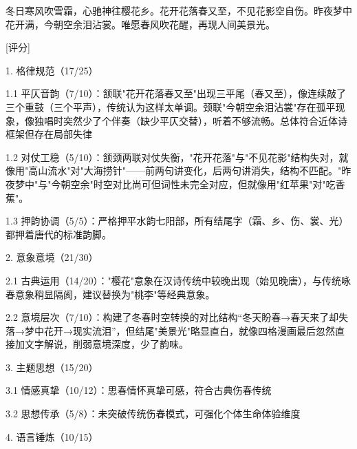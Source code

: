 \begin{tcolorbox}[
    breakable,            %
    colback=white, %
    colframe=black, 
    boxrule=1pt,        %
    arc=0mm             %
    ]
    \kaishu 
    冬日寒风吹雪霜，心驰神往樱花乡。花开花落春又至，不见花影空自伤。昨夜梦中花开满，今朝空余泪沾裳。唯愿春风吹花醒，再现人间美景光。

    \vspace{0.1em}
    \noindent\dotfill

    [评分]\par
    1. 格律规范（17/25）\par
        \hspace{2em}1.1 平仄音韵（7/10）：颔联"花开花落春又至"出现三平尾（春又至），像连续敲了三个重鼓（三个平声），传统认为这样太单调。颈联"今朝空余泪沾裳"存在孤平现象，像独唱时突然少了个伴奏（缺少平仄交替），听着不够流畅。总体符合近体诗框架但存在局部失律\par
        \hspace{2em}1.2 对仗工稳（5/10）：颔颈两联对仗失衡，"花开花落"与"不见花影"结构失对，就像用"高山流水"对"大海捞针"——前两句讲变化，后两句讲消失，结构不匹配。"昨夜梦中"与"今朝空余"时空对比尚可但词性未完全对应，但就像用"红苹果"对"吃香蕉"。\par
        \hspace{2em}1.3 押韵协调（5/5）：严格押平水韵七阳部，所有结尾字（霜、乡、伤、裳、光）都押着唐代的标准韵脚。\par
    2. 意象意境（21/30）\par
        \hspace{2em}2.1 古典运用（14/20）："樱花"意象在汉诗传统中较晚出现（始见晚唐），与传统咏春意象稍显隔阂，建议替换为"桃李"等经典意象。\par
        \hspace{2em}2.2 意境层次（7/10）：构建了冬春时空转换的对比结构“冬天盼春→春天来了却失落→梦中花开→现实流泪”，但结尾"美景光"略显直白，就像四格漫画最后忽然直接加文字解说，削弱意境深度，少了韵味。\par
    3. 主题思想（15/20）\par
    \hspace{2em}3.1 情感真挚（10/12）：思春情怀真挚可感，符合古典伤春传统\par
    \hspace{2em}3.2 思想传承（5/8）：未突破传统伤春模式，可强化个体生命体验维度\par
    4. 语言锤炼（10/15）\par

\end{tcolorbox}
